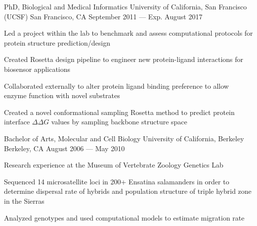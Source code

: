 

\begin{cventries}

  \cventry
  {PhD, Biological and Medical Informatics} %
  {University of California, San Francisco (UCSF)} %
  {San Francisco, CA} %
  {September 2011 --- Exp. August 2017} %
  {
    \begin{cvitems} %
    \item Led a project within the lab to benchmark and assess computational protocols for protein structure prediction/design
    \item Created Rosetta design pipeline to
      engineer new protein-ligand interactions for biosensor applications
    \item Collaborated externally to alter protein ligand binding preference to allow enzyme function with novel substrates
    \item Created a novel conformational sampling Rosetta method to predict protein interface $\Delta\Delta G$ values by sampling backbone structure space
    \end{cvitems}
  }

  \cventry
  {Bachelor of Arts, Molecular and Cell Biology} %
  {University of California, Berkeley} %
  {Berkeley, CA} %
  {August 2006 --- May 2010} %
  {
    \begin{cvitems} %
    \item Research experience at the Museum of Vertebrate Zoology Genetics Lab
    \item Sequenced 14 microsatellite loci in 200+ Ensatina salamanders in order to determine dispersal rate of hybrids and population structure of triple hybrid zone in the Sierras
    \item Analyzed genotypes and used computational models to estimate migration rate
    \end{cvitems}
  }

\end{cventries}
